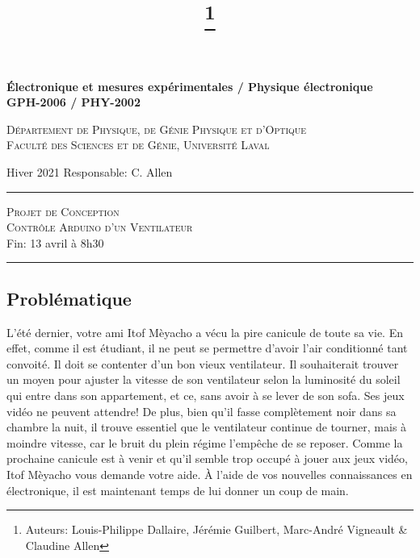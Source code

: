 \documentclass[english,french,12pt]{article}
\title{\vspace{-7em}\thanks{Auteurs: Louis-Philippe Dallaire, Jérémie Guilbert, Marc-André Vigneault \& Claudine Allen}}
\date{}
\begin{document}
\maketitle\thispagestyle{fancy}
%
%
\begin{center}
    \textbf{\large{Électronique et mesures expérimentales / Physique électronique}}\\
    \vspace{0.2em}
    \textbf{GPH-2006 / PHY-2002}

    \textsc{Département de Physique, de Génie Physique et d'Optique\\
    Faculté des Sciences et de Génie, Université Laval}
\end{center}

\vspace{-1em}
\noindent Hiver 2021 \hfill Responsable: C. Allen\par
\vspace{0.2em}
\hrule
\vspace{0.5em}
\centering
    \textsc{Projet de Conception\\
    Contrôle Arduino d'un Ventilateur}\\
\vspace{0.5em}
\hfill Fin: 13 avril à 8h30
\vspace{0.4em}
\hrule
\justify
%
\vspace{-1.5em}
\subsection*{Problématique}
\vspace{-0.5em}
L’été dernier, votre ami Itof Mèyacho a vécu la pire canicule de toute sa vie. En effet, comme il est étudiant, il ne peut se permettre d’avoir l’air conditionné tant convoité. Il doit se contenter d’un bon vieux ventilateur. Il souhaiterait trouver un moyen pour ajuster la vitesse de son ventilateur selon la luminosité du soleil qui entre dans son appartement, et ce, sans avoir à se lever de son sofa. Ses jeux vidéo ne peuvent attendre! De plus, bien qu’il fasse complètement noir dans sa chambre la nuit, il trouve essentiel que le ventilateur continue de tourner, mais à moindre vitesse, car le bruit du plein régime l’empêche de se reposer. Comme la prochaine canicule est à venir et qu’il semble trop occupé à jouer aux jeux vidéo, Itof Mèyacho vous demande votre aide. À l'aide de vos nouvelles connaissances en électronique, il est maintenant temps de lui donner un coup de main.
\end{document}
